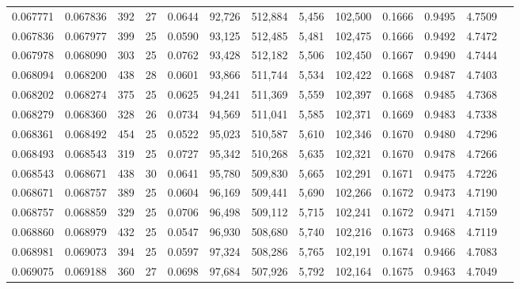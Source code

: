 \begin{tabular}{rrrrrrrrrrrrr}
0.067771 & 0.067836 & 392 &  27 &                                     0.0644 &  92,726 & 512,884 &   5,456 & 102,500 & 0.1666 & 0.9495 & 4.7509 \\
0.067836 & 0.067977 & 399 &  25 &                                     0.0590 &  93,125 & 512,485 &   5,481 & 102,475 & 0.1666 & 0.9492 & 4.7472 \\
0.067978 & 0.068090 & 303 &  25 &                                     0.0762 &  93,428 & 512,182 &   5,506 & 102,450 & 0.1667 & 0.9490 & 4.7444 \\
0.068094 & 0.068200 & 438 &  28 &                                     0.0601 &  93,866 & 511,744 &   5,534 & 102,422 & 0.1668 & 0.9487 & 4.7403 \\
0.068202 & 0.068274 & 375 &  25 &                                     0.0625 &  94,241 & 511,369 &   5,559 & 102,397 & 0.1668 & 0.9485 & 4.7368 \\
0.068279 & 0.068360 & 328 &  26 &                                     0.0734 &  94,569 & 511,041 &   5,585 & 102,371 & 0.1669 & 0.9483 & 4.7338 \\
0.068361 & 0.068492 & 454 &  25 &                                     0.0522 &  95,023 & 510,587 &   5,610 & 102,346 & 0.1670 & 0.9480 & 4.7296 \\
0.068493 & 0.068543 & 319 &  25 &                                     0.0727 &  95,342 & 510,268 &   5,635 & 102,321 & 0.1670 & 0.9478 & 4.7266 \\
0.068543 & 0.068671 & 438 &  30 &                                     0.0641 &  95,780 & 509,830 &   5,665 & 102,291 & 0.1671 & 0.9475 & 4.7226 \\
0.068671 & 0.068757 & 389 &  25 &                                     0.0604 &  96,169 & 509,441 &   5,690 & 102,266 & 0.1672 & 0.9473 & 4.7190 \\
0.068757 & 0.068859 & 329 &  25 &                                     0.0706 &  96,498 & 509,112 &   5,715 & 102,241 & 0.1672 & 0.9471 & 4.7159 \\
0.068860 & 0.068979 & 432 &  25 &                                     0.0547 &  96,930 & 508,680 &   5,740 & 102,216 & 0.1673 & 0.9468 & 4.7119 \\
0.068981 & 0.069073 & 394 &  25 &                                     0.0597 &  97,324 & 508,286 &   5,765 & 102,191 & 0.1674 & 0.9466 & 4.7083 \\
0.069075 & 0.069188 & 360 &  27 &                                     0.0698 &  97,684 & 507,926 &   5,792 & 102,164 & 0.1675 & 0.9463 & 4.7049 \\

\end{tabular}
